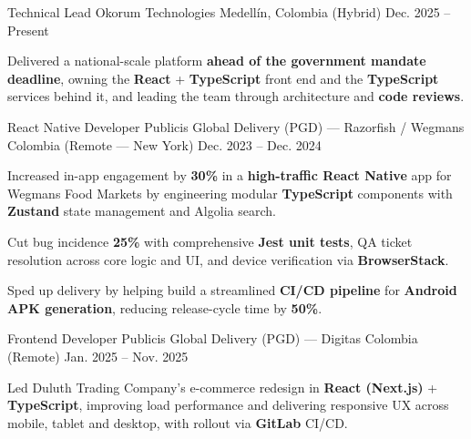 \newcommand{\quotes}[1]{``#1''}

\begin{cventries}

  \cventry
  {Technical Lead}
  {Okorum Technologies}
  {Medellín, Colombia (Hybrid)}
  {Dec. 2025 -- Present}
  {
    \begin{cvitems}
      \item {Delivered a national-scale platform \textbf{ahead of the government mandate deadline}, owning the \textbf{React} + \textbf{TypeScript} front end and the \textbf{TypeScript} services behind it, and leading the team through architecture and \textbf{code reviews}.}
    \end{cvitems}
  }

  \cventry
  {React Native Developer}
  {Publicis Global Delivery (PGD) — Razorfish / Wegmans}
  {Colombia (Remote — New York)}
  {Dec. 2023 -- Dec. 2024}
  {
    \begin{cvitems}
      \item {Increased in-app engagement by \textbf{30\%} in a \textbf{high-traffic React Native} app for Wegmans Food Markets by engineering modular \textbf{TypeScript} components with \textbf{Zustand} state management and Algolia search.}
      \item {Cut bug incidence \textbf{25\%} with comprehensive \textbf{Jest unit tests}, QA ticket resolution across core logic and UI, and device verification via \textbf{BrowserStack}.}
      \item {Sped up delivery by helping build a streamlined \textbf{CI/CD pipeline} for \textbf{Android APK generation}, reducing release-cycle time by \textbf{50\%}.}
    \end{cvitems}
  }

  \cventry
  {Frontend Developer}
  {Publicis Global Delivery (PGD) — Digitas}
  {Colombia (Remote)}
  {Jan. 2025 -- Nov. 2025}
  {
    \begin{cvitems}
      \item {Led Duluth Trading Company's e-commerce redesign in \textbf{React (Next.js)} + \textbf{TypeScript}, improving load performance and delivering responsive UX across mobile, tablet and desktop, with rollout via \textbf{GitLab} CI/CD.}
    \end{cvitems}
  }


\end{cventries}
